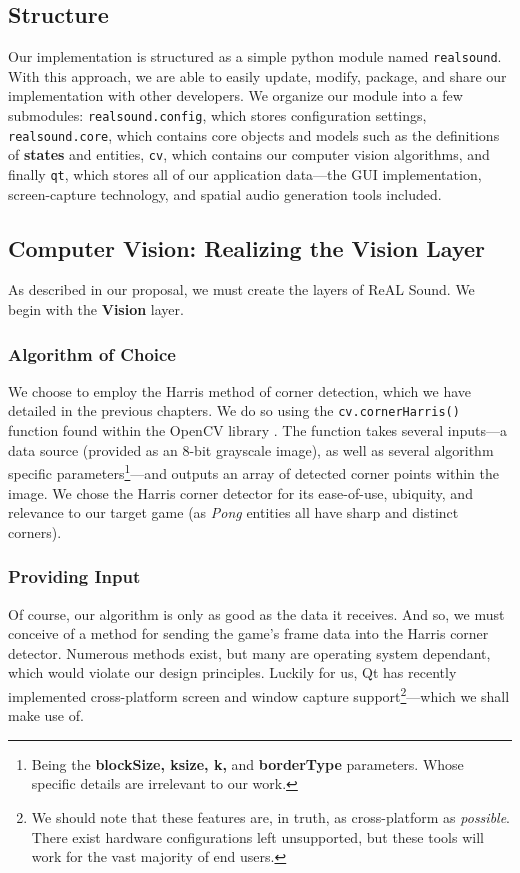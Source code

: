 \documentclass{report}
\newcommand{\rs}{ReAL Sound\xspace}
\newcommand{\state}[1]{\textbf{#1}}
\newcommand{\vision}{\textbf{Vision}\xspace}
\newcommand{\tech}[1]{\textbf{#1}}
\begin{document}
\subsection{Structure}

Our implementation is structured as a simple python module named \texttt{realsound}. With this approach, we are able to easily update, modify, package, and share our implementation with other developers. We organize our module into a few submodules: \texttt{realsound.config}, which stores configuration settings, \texttt{realsound.core}, which contains core objects and models such as the definitions of \state{states} and entities, \texttt{cv}, which contains our computer vision algorithms, and finally \texttt{qt}, which stores all of our application data---the GUI implementation, screen-capture technology, and spatial audio generation tools included. 

\subsection{Computer Vision: Realizing the Vision Layer}
As described in our proposal, we must create the layers of \rs. We begin with the \vision layer. 

\subsubsection{Algorithm of Choice}

We choose to employ the Harris method of corner detection, which we have detailed in the previous chapters. We do so using the \texttt{cv.cornerHarris()} function found within the OpenCV library \cite{OpenCV}. The function takes several inputs---a data source (provided as an 8-bit grayscale image), as well as several algorithm specific parameters\footnote{Being the \tech{blockSize, ksize, k, } and \tech{borderType} parameters. Whose specific details are irrelevant to our work.}---and outputs an array of detected corner points within the image. We chose the Harris corner detector for its ease-of-use, ubiquity, and relevance to our target game (as \emph{Pong} entities all have sharp and distinct corners).


\subsubsection{Providing Input}
Of course, our algorithm is only as good as the data it receives. And so, we must conceive of a method for sending the game's frame data into the Harris corner detector. Numerous methods exist, but many are operating system dependant, which would violate our design principles. Luckily for us, Qt has recently implemented cross-platform screen and window capture support\footnote{We should note that these features are, in truth, as cross-platform as \emph{possible}. There exist hardware configurations left unsupported, but these tools will work for the vast majority of end users.}---which we shall make use of.
 
\end{document}
